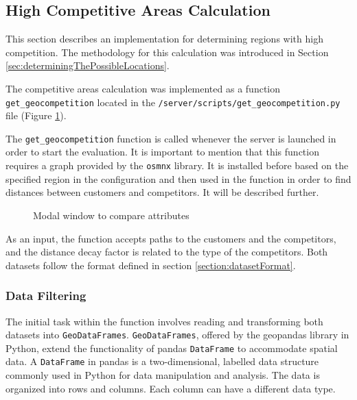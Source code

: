 \subsection{High Competitive Areas Calculation}
\label{subsec:highCompetitiveAreasCalculation}

This section describes an implementation for determining regions with high competition. The methodology for this calculation was introduced in Section \ref{sec:determiningThePossibleLocations}.

The competitive areas calculation was implemented as a function \texttt{get\_geocompetition} located in the \texttt{/server/scripts/get\_geocompetition.py} file (Figure \ref{fig:competitiveAreasCalculationDiagram}).

The \texttt{get\_geocompetition} function is called whenever the server is launched in order to start the evaluation. It is important to mention that this function requires a graph provided by the \texttt{osmnx} library. It is installed before based on the specified region in the configuration and then used in the function in order to find distances between customers and competitors. It will be described further.

\begin{figure}[ht]\centering
  \centering
  
  \caption{Modal window to compare attributes}
  \label{fig:competitiveAreasCalculationDiagram}
\end{figure}

As an input, the function accepts paths to the customers and the competitors, and the distance decay factor is related to the type of the competitors. Both datasets follow the format defined in section \ref{section:datasetFormat}.

\subsubsection{Data Filtering}

The initial task within the function involves reading and transforming both datasets into \texttt{GeoDataFrames}. \texttt{GeoDataFrames}, offered by the geopandas library in Python, extend the functionality of pandas \texttt{DataFrame} to accommodate spatial data. A \texttt{DataFrame} in pandas is a two-dimensional, labelled data structure commonly used in Python for data manipulation and analysis. The data is organized into rows and columns. Each column can have a different data type. 

